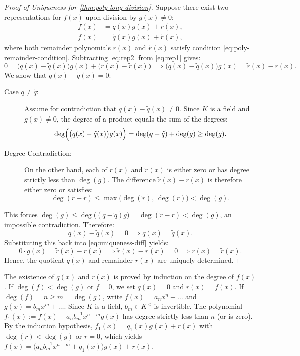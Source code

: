 \begin{content}
\begin{proof}[Proof of Uniqueness for \cref{thm:poly-long-division}]
Suppose there exist two representations for $f(x)$ upon division by $g(x) \neq 0$:
\begin{align}
f(x) &= q(x) g(x) + r(x), \label{eq:rep1} \\
f(x) &= \tilde{q}(x) g(x) + \tilde{r}(x), \label{eq:rep2}
\end{align}
where both remainder polynomials $r(x)$ and $\tilde{r}(x)$ satisfy condition \eqref{eq:poly-remainder-condition}.
Subtracting \eqref{eq:rep2} from \eqref{eq:rep1} gives:
\begin{equation}\label{eq:uniqueness-diff}
0 = \bigl(q(x) - \tilde{q}(x)\bigr) g(x) + \bigl(r(x) - \tilde{r}(x)\bigr) \implies \bigl(q(x) - \tilde{q}(x)\bigr) g(x) = \tilde{r}(x) - r(x).
\end{equation}
We show that $q(x) - \tilde{q}(x) = 0$:
\begin{description}
    \item[Case $q \neq \tilde{q}$:] Assume for contradiction that $q(x) - \tilde{q}(x) \neq 0$. Since $K$ is a field and $g(x) \neq 0$, the degree of a product equals the sum of the degrees:
    \[
    \deg\Bigl(\bigl(q(x) - \tilde{q}(x)\bigr) g(x)\Bigr) = \deg(q - \tilde{q}) + \deg(g) \ge \deg(g).
    \]
    \item[Degree Contradiction:] On the other hand, each of $r(x)$ and $\tilde{r}(x)$ is either zero or has degree strictly less than $\deg(g)$. The difference $\tilde{r}(x) - r(x)$ is therefore either zero or satisfies:
    \[
    \deg(\tilde{r} - r) \le \max\bigl(\deg(\tilde{r}), \, \deg(r)\bigr) < \deg(g).
    \]
\end{description}
This forces $\deg(g) \le \deg\bigl((q - \tilde{q})g\bigr) = \deg(\tilde{r} - r) < \deg(g)$, an impossible contradiction.
Therefore:
\[
q(x) - \tilde{q}(x) = 0 \implies q(x) = \tilde{q}(x).
\]
Substituting this back into \eqref{eq:uniqueness-diff} yields:
\[
0 \cdot g(x) = \tilde{r}(x) - r(x) \implies \tilde{r}(x) - r(x) = 0 \implies r(x) = \tilde{r}(x).
\]
Hence, the quotient $q(x)$ and remainder $r(x)$ are uniquely determined.
\end{proof}
\end{content}

\begin{aiNote}
The existence of $q(x)$ and $r(x)$ is proved by induction on the degree of $f(x)$. If $\deg(f) < \deg(g)$ or $f = 0$, we set $q(x) = 0$ and $r(x) = f(x)$. If $\deg(f) = n \ge m = \deg(g)$, write $f(x) = a_n x^n + \dots$ and $g(x) = b_m x^m + \dots$. Since $K$ is a field, $b_m \in K^\times$ is invertible. The polynomial $f_1(x) := f(x) - a_n b_m^{-1} x^{n-m} g(x)$ has degree strictly less than $n$ (or is zero). By the induction hypothesis, $f_1(x) = q_1(x) g(x) + r(x)$ with $\deg(r) < \deg(g)$ or $r = 0$, which yields $f(x) = \bigl(a_n b_m^{-1} x^{n-m} + q_1(x)\bigr) g(x) + r(x)$.
\end{aiNote}


